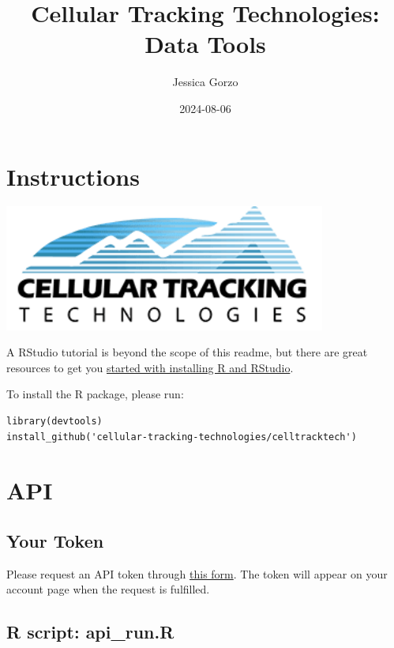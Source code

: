 \documentclass[
]{book}
\title{Cellular Tracking Technologies: Data Tools}
\author{Jessica Gorzo}
\date{2024-08-06}
\begin{document}
\maketitle

{
\setcounter{tocdepth}{1}
\tableofcontents
}
\chapter*{Instructions}\label{instructions}

\includegraphics[width=4.17in]{bookdown-demo_files/figure-html/unnamed}

A RStudio tutorial is beyond the scope of this readme, but there are great resources to get you \href{https://www.earthdatascience.org/courses/earth-analytics/document-your-science/setup-r-rstudio/}{started with installing R and RStudio}.

To install the R package, please run:

\begin{verbatim}
library(devtools)
install_github('cellular-tracking-technologies/celltracktech')
\end{verbatim}

\chapter{API}\label{intro}

\section{Your Token}\label{your-token}

Please request an API token through \href{https://celltracktech.com/pages/csd-radio-api-key-request}{this form}. The token will appear on your account page when the request is fulfilled.

\section{R script: api\_run.R}\label{r-script-api_run.r}
\end{document}
